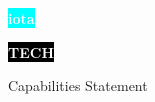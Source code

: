 \documentclass[11pt]{developercv} %
\begin{document}

\begin{minipage}[t]{0.65\textwidth} %
	\vspace{-\baselineskip} %
	
	\colorbox{cyan}{{\HUGE\textcolor{white}{\textbf{{iota}}}}} %
	
	\colorbox{black}{{\Huge\textcolor{white}{\textbf{\MakeUppercase{Tech}}}}} %
	
	\vspace{6pt}
	
	{\huge Capabilities Statement} %
\end{minipage}
\begin{minipage}[t]{0.45\textwidth} %
	\vspace{-\baselineskip} %
	
	\\
	\\
	\\	
\end{minipage}


\vspace{0.5cm}

\end{document}
